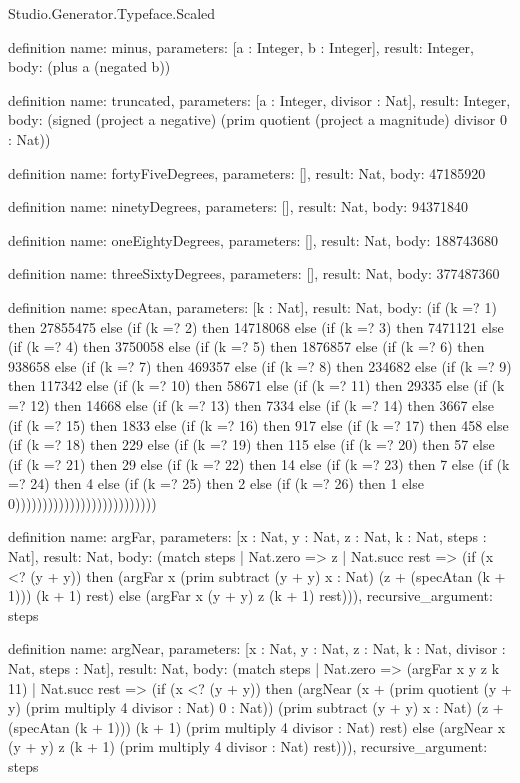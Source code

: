 \begin{lexlean}{Studio.Generator.Typeface.Scaled}
\begin{semanticmodule}
definition{
  name: minus,
  parameters: [a : Integer, b : Integer],
  result: Integer,
  body: (plus a (negated b))
}

definition{
  name: truncated,
  parameters: [a : Integer, divisor : Nat],
  result: Integer,
  body: (signed (project a negative) (prim quotient (project a magnitude) divisor 0 : Nat))
}

definition{
  name: fortyFiveDegrees,
  parameters: [],
  result: Nat,
  body: 47185920
}

definition{
  name: ninetyDegrees,
  parameters: [],
  result: Nat,
  body: 94371840
}

definition{
  name: oneEightyDegrees,
  parameters: [],
  result: Nat,
  body: 188743680
}

definition{
  name: threeSixtyDegrees,
  parameters: [],
  result: Nat,
  body: 377487360
}

definition{
  name: specAtan,
  parameters: [k : Nat],
  result: Nat,
  body: (if (k =? 1) then 27855475 else (if (k =? 2) then 14718068 else (if (k =? 3) then 7471121 else (if (k =? 4) then 3750058 else (if (k =? 5) then 1876857 else (if (k =? 6) then 938658 else (if (k =? 7) then 469357 else (if (k =? 8) then 234682 else (if (k =? 9) then 117342 else (if (k =? 10) then 58671 else (if (k =? 11) then 29335 else (if (k =? 12) then 14668 else (if (k =? 13) then 7334 else (if (k =? 14) then 3667 else (if (k =? 15) then 1833 else (if (k =? 16) then 917 else (if (k =? 17) then 458 else (if (k =? 18) then 229 else (if (k =? 19) then 115 else (if (k =? 20) then 57 else (if (k =? 21) then 29 else (if (k =? 22) then 14 else (if (k =? 23) then 7 else (if (k =? 24) then 4 else (if (k =? 25) then 2 else (if (k =? 26) then 1 else 0))))))))))))))))))))))))))
}

definition{
  name: argFar,
  parameters: [x : Nat, y : Nat, z : Nat, k : Nat, steps : Nat],
  result: Nat,
  body: (match steps
    | Nat.zero => z
    | Nat.succ rest => (if (x <? (y + y)) then (argFar x (prim subtract (y + y) x : Nat) (z + (specAtan (k + 1))) (k + 1) rest) else (argFar x (y + y) z (k + 1) rest))),
  recursive_argument: steps
}

definition{
  name: argNear,
  parameters: [x : Nat, y : Nat, z : Nat, k : Nat, divisor : Nat, steps : Nat],
  result: Nat,
  body: (match steps
    | Nat.zero => (argFar x y z k 11)
    | Nat.succ rest => (if (x <? (y + y)) then (argNear (x + (prim quotient (y + y) (prim multiply 4 divisor : Nat) 0 : Nat)) (prim subtract (y + y) x : Nat) (z + (specAtan (k + 1))) (k + 1) (prim multiply 4 divisor : Nat) rest) else (argNear x (y + y) z (k + 1) (prim multiply 4 divisor : Nat) rest))),
  recursive_argument: steps
}


\end{semanticmodule}
\end{lexlean}
